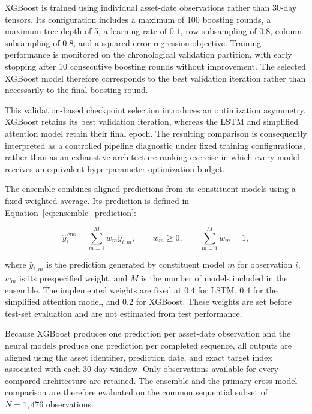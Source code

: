 \documentclass[utf8]{FrontiersinHarvard} %
\begin{document}
XGBoost is trained using individual asset-date observations rather than 30-day tensors. Its configuration includes a maximum of 100 boosting rounds, a maximum tree depth of 5, a learning rate of \(0.1\), row subsampling of \(0.8\), column subsampling of \(0.8\), and a squared-error regression objective. Training performance is monitored on the chronological validation partition, with early stopping after 10 consecutive boosting rounds without improvement. The selected XGBoost model therefore corresponds to the best validation iteration rather than necessarily to the final boosting round.

This validation-based checkpoint selection introduces an optimization asymmetry. XGBoost retains its best validation iteration, whereas the LSTM and simplified attention model retain their final epoch. The resulting comparison is consequently interpreted as a controlled pipeline diagnostic under fixed training configurations, rather than as an exhaustive architecture-ranking exercise in which every model receives an equivalent hyperparameter-optimization budget.

The ensemble combines aligned predictions from its constituent models using a fixed weighted average. Its prediction is defined in Equation~\ref{eq:ensemble_prediction}:

\begin{equation}
	\hat{y}^{\,\mathrm{ens}}_i
	=
	\sum_{m=1}^{M}
	w_m\hat{y}_{i,m},
	\qquad
	w_m\geq 0,
	\qquad
	\sum_{m=1}^{M}w_m=1,
	\label{eq:ensemble_prediction}
\end{equation}

where \(\hat{y}_{i,m}\) is the prediction generated by constituent model \(m\) for observation \(i\), \(w_m\) is its prespecified weight, and \(M\) is the number of models included in the ensemble. The implemented weights are fixed at \(0.4\) for LSTM, \(0.4\) for the simplified attention model, and \(0.2\) for XGBoost. These weights are set before test-set evaluation and are not estimated from test performance.

Because XGBoost produces one prediction per asset-date observation and the neural models produce one prediction per completed sequence, all outputs are aligned using the asset identifier, prediction date, and exact target index associated with each 30-day window. Only observations available for every compared architecture are retained. The ensemble and the primary cross-model comparison are therefore evaluated on the common sequential subset of \(N=1{,}476\) observations.
\end{document}
